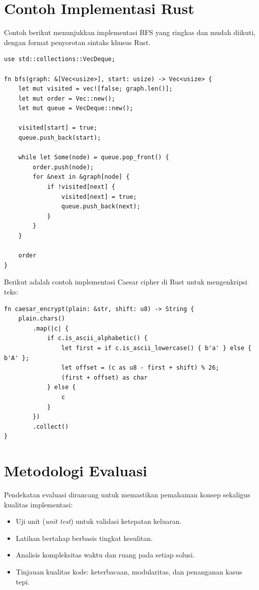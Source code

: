 \documentclass{article}
\begin{document}
\section{Contoh Implementasi Rust}
Contoh berikut menunjukkan implementasi BFS yang ringkas dan mudah diikuti, dengan format
penyorotan sintaks khusus Rust.

\begin{lstlisting}[style=ruststyle,caption={Contoh BFS sederhana di Rust}]
use std::collections::VecDeque;

fn bfs(graph: &[Vec<usize>], start: usize) -> Vec<usize> {
    let mut visited = vec![false; graph.len()];
    let mut order = Vec::new();
    let mut queue = VecDeque::new();

    visited[start] = true;
    queue.push_back(start);

    while let Some(node) = queue.pop_front() {
        order.push(node);
        for &next in &graph[node] {
            if !visited[next] {
                visited[next] = true;
                queue.push_back(next);
            }
        }
    }

    order
}
\end{lstlisting}

Berikut adalah contoh implementasi Caesar cipher di Rust untuk mengenkripsi teks:

\begin{lstlisting}[style=ruststyle,caption={Caesar cipher di Rust}]
fn caesar_encrypt(plain: &str, shift: u8) -> String {
    plain.chars()
        .map(|c| {
            if c.is_ascii_alphabetic() {
                let first = if c.is_ascii_lowercase() { b'a' } else { b'A' };
                let offset = (c as u8 - first + shift) % 26;
                (first + offset) as char
            } else {
                c
            }
        })
        .collect()
}
\end{lstlisting}

\section{Metodologi Evaluasi}
Pendekatan evaluasi dirancang untuk memastikan pemahaman konsep sekaligus kualitas implementasi:
\begin{itemize}
  \item Uji unit (\textit{unit test}) untuk validasi ketepatan keluaran.
  \item Latihan bertahap berbasis tingkat kesulitan.
  \item Analisis kompleksitas waktu dan ruang pada setiap solusi.
  \item Tinjauan kualitas kode: keterbacaan, modularitas, dan penanganan kasus tepi.
\end{itemize}
\end{document}
